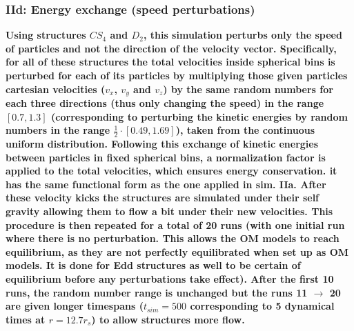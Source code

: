 \subsubsection{IId: Energy exchange (speed perturbations)}
\textbf{Using structures $CS_4$ and $D_2$, this simulation perturbs only the speed of particles and not the direction of the velocity vector. Specifically, for all of these structures the total velocities inside spherical bins is perturbed for each of its particles by multiplying those given particles cartesian velocities ($v_x$, $v_y$ and $v_z$) by the same random numbers for each three directions (thus only changing the speed) in the range $[0.7, 1.3]$ (corresponding to perturbing the kinetic energies by random numbers in the range $\frac{1}{2}\cdot[0.49, 1.69]$), taken from the continuous uniform distribution. Following this exchange of kinetic energies between particles in fixed spherical bins, a normalization factor is applied to the total velocities, which ensures energy conservation. it has the same functional form as the one applied in sim. IIa. After these velocity kicks the structures are simulated under their self gravity allowing them to flow a bit under their new velocities. This procedure is then repeated for a total of 20 runs (with one initial run where there is no perturbation. This allows the OM models to reach equilibrium, as they are not perfectly equilibrated when set up as OM models. It is done for Edd structures as well to be certain of equilibrium before any perturbations take effect). After the first 10 runs, the random number range is unchanged but the runs 11 $\rightarrow$ 20 are given longer timespans ($t_{sim} = 500$ corresponding to 5 dynamical times at $r = 12.7r_s$) to allow structures more flow.} \\ \\


